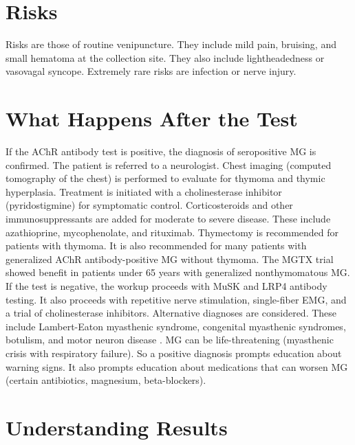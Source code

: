 \section*{Risks}
Risks are those of routine venipuncture. They include mild pain, bruising, and small hematoma at the collection site. They also include lightheadedness or vasovagal syncope. Extremely rare risks are infection or nerve injury.

\section*{What Happens After the Test}
If the AChR antibody test is positive, the diagnosis of seropositive MG is confirmed. The patient is referred to a neurologist. Chest imaging (computed tomography of the chest) is performed to evaluate for thymoma and thymic hyperplasia. Treatment is initiated with a cholinesterase inhibitor (pyridostigmine) for symptomatic control. Corticosteroids and other immunosuppressants are added for moderate to severe disease. These include azathioprine, mycophenolate, and rituximab. Thymectomy is recommended for patients with thymoma. It is also recommended for many patients with generalized AChR antibody-positive MG without thymoma. The MGTX trial showed benefit in patients under 65 years with generalized nonthymomatous MG. If the test is negative, the workup proceeds with MuSK and LRP4 antibody testing. It also proceeds with repetitive nerve stimulation, single-fiber EMG, and a trial of cholinesterase inhibitors. Alternative diagnoses are considered. These include Lambert-Eaton myasthenic syndrome, congenital myasthenic syndromes, botulism, and motor neuron disease \cite{sanders2016international}. MG can be life-threatening (myasthenic crisis with respiratory failure). So a positive diagnosis prompts education about warning signs. It also prompts education about medications that can worsen MG (certain antibiotics, magnesium, beta-blockers).

\section*{Understanding Results}

